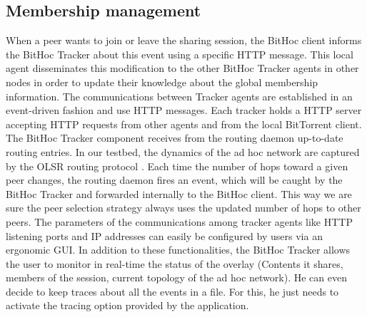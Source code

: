 \subsection{Membership management}
When a peer wants to join or leave the sharing session, the BitHoc client informs the BitHoc Tracker about this event using a specific HTTP message. This local agent disseminates this modification to the other BitHoc Tracker agents in other nodes in order to update their knowledge about the global membership information. The communications between Tracker agents are established in an event-driven fashion and use HTTP messages. Each tracker holds a HTTP server accepting HTTP requests from other agents and from the local BitTorrent client. The BitHoc Tracker component receives from the routing daemon up-to-date routing entries. In our testbed, the dynamics of the ad hoc network are captured by the OLSR routing protocol \cite{MOLSR}. Each time the number of hops toward a given peer changes, the routing daemon fires an event, which will be caught by the BitHoc Tracker and forwarded internally to the BitHoc client. This way we are sure the peer selection strategy always uses the updated number of hops to other peers. The parameters of the communications among tracker agents like HTTP listening ports and IP addresses can easily be configured by users via an ergonomic GUI. In addition to these functionalities, the BitHoc Tracker allows the user to monitor in real-time the status of the overlay (Contents it shares, members of the session, current topology of the ad hoc network). He can even decide to keep traces about all the events in a file. For this, he just needs to activate the tracing option provided by the application.

